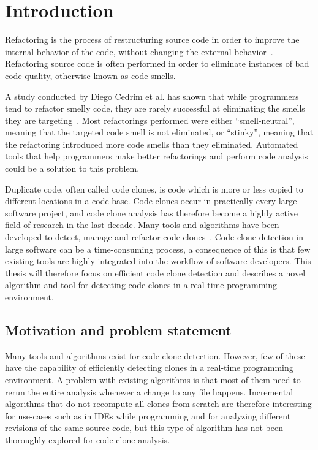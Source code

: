 \chapter{Introduction}

Refactoring is the process of restructuring source code in order to improve the internal
behavior of the code, without changing the external behavior~\cite[9]{fowlerrefactoring}.
Refactoring source code is often performed in order to eliminate instances of bad code
quality, otherwise known as code smells.

A study conducted by Diego Cedrim et al. has shown that while programmers tend to refactor
smelly code, they are rarely successful at eliminating the smells they are
targeting~\cite{Rohit_Gheyi_Impact}. Most refactorings performed were either
``smell-neutral'', meaning that the targeted code smell is not eliminated, or ``stinky'',
meaning that the refactoring introduced more code smells than they eliminated. Automated
tools that help programmers make better refactorings and perform code analysis could be a
solution to this problem. 

Duplicate code, often called code clones, is code which is more or less copied to
different locations in a code base. Code clones occur in practically every large software
project, and code clone analysis has therefore become a highly active field of research in
the last decade. Many tools and algorithms have been developed to detect, manage and
refactor code clones~\cite[6]{Inoue_introduction_to_cc}. Code clone detection in large
software can be a time-consuming process, a consequence of this is that few existing tools
are highly integrated into the workflow of software developers. This thesis will therefore
focus on efficient code clone detection and describes a novel algorithm and tool for
detecting code clones in a real-time programming environment.

\section{Motivation and problem statement}

Many tools and algorithms exist for code clone detection. However, few of these have the
capability of efficiently detecting clones in a real-time programming environment. A problem
with existing algorithms is that most of them need to rerun the entire analysis whenever a
change to any file happens. Incremental algorithms that do not recompute all clones from
scratch are therefore interesting for use-cases such as in IDEs while programming and for
analyzing different revisions of the same source code, but this type of algorithm has not
been thoroughly explored for code clone analysis.

